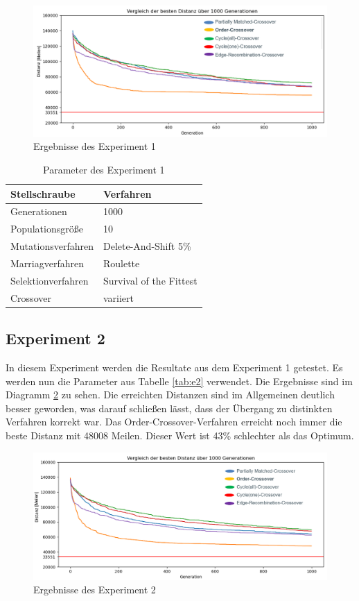 \begin{figure}[H]
\centering
\includegraphics[width=1\textwidth]{img/Vortrag/experiment1.png}
\caption{Ergebnisse des Experiment 1}
\label{fig:experiment1}
\end{figure}

\begin{table}[H]
\centering
\caption{Parameter des Experiment 1}
\begin{tabular}{ll}
Stellschraube & Verfahren \\
\hline
Generationen & 1000 \\
Populationsgröße & 10 \\
Mutationsverfahren & Delete-And-Shift 5\% \\
Marriagverfahren & Roulette \\
Selektionverfahren & Survival of the Fittest \\
Crossover & variiert
\end{tabular}
\label{tab:e1}
\end{table}

\subsection{Experiment 2}
In diesem Experiment werden die Resultate aus dem Experiment 1 getestet. Es werden nun die Parameter aus Tabelle \ref{tab:e2} verwendet. Die Ergebnisse sind im Diagramm \ref{fig:experiment2} zu sehen.
Die erreichten Distanzen sind im Allgemeinen deutlich besser geworden, was darauf schließen lässt, dass der Übergang zu distinkten Verfahren korrekt war. Das Order-Crossover-Verfahren erreicht noch immer die beste Distanz mit 48008 Meilen. Dieser Wert ist 43\% schlechter als das Optimum.

\begin{figure}[H]
\centering
\includegraphics[width=1\textwidth]{img/Vortrag/experiment2.png}
\caption{Ergebnisse des Experiment 2}
\label{fig:experiment2}
\end{figure}

